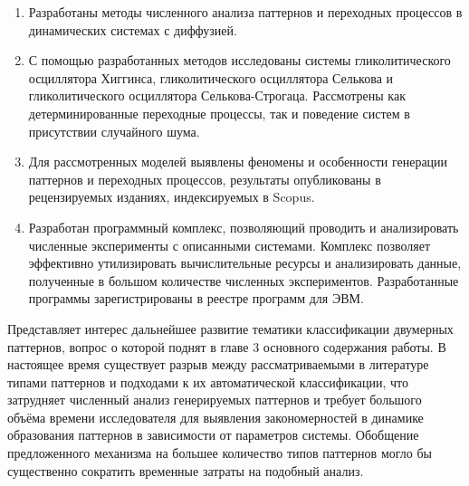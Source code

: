\begin{enumerate}
  \item Разработаны методы численного анализа паттернов и переходных процессов в динамических системах с диффузией. 
  \item С помощью разработанных методов исследованы системы гликолитического осциллятора Хиггинса, гликолитического осциллятора Селькова и гликолитического осциллятора Селькова-Строгаца. Рассмотрены как детерминированные переходные процессы, так и поведение систем в присутствии случайного шума.
  \item Для рассмотренных моделей выявлены феномены и особенности генерации паттернов и переходных процессов, результаты опубликованы в рецензируемых изданиях, индексируемых в Scopus.
  \item Разработан программный комплекс, позволяющий проводить и анализировать численные эксперименты с описанными системами. Комплекс позволяет эффективно утилизировать вычислительные ресурсы и анализировать данные, полученные в большом количестве численных экспериментов. Разработанные программы зарегистрированы в реестре программ для ЭВМ.
\end{enumerate}

Представляет интерес дальнейшее развитие тематики классификации двумерных паттернов, вопрос о которой поднят в главе 3 основного содержания работы. В настоящее время существует разрыв между рассматриваемыми в литературе типами паттернов и подходами к их автоматической классификации, что затрудняет численный анализ генерируемых паттернов и требует большого объёма времени исследователя для выявления закономерностей в динамике образования паттернов в зависимости от параметров системы. Обобщение предложенного механизма на большее количество типов паттернов могло бы существенно сократить временные затраты на подобный анализ.
